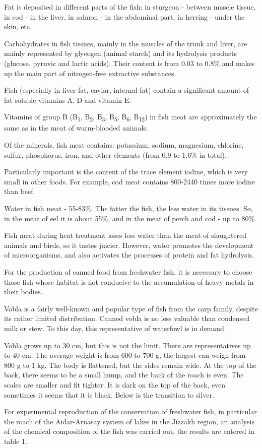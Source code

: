 \begin{multicols}{2}
Fat is deposited in different parts of the fish: in sturgeon - between
muscle tissue, in cod - in the liver, in salmon - in the abdominal part,
in herring - under the skin, etc.

Carbohydrates in fish tissues, mainly in the muscles of the trunk and
liver, are mainly represented by glycogen (animal starch) and its
hydrolysis products (glucose, pyruvic and lactic acids). Their content
is from 0.03 to 0.8\% and makes up the main part of nitrogen-free
extractive substances.

Fish (especially in liver fat, caviar, internal fat) contain a
significant amount of fat-soluble vitamins A, D and vitamin E.

Vitamins of group B (B\textsubscript{1}, B\textsubscript{2},
B\textsubscript{3}, B\textsubscript{5}, B\textsubscript{6},
B\textsubscript{12}) in fish meat are approximately the same as in the
meat of warm-blooded animals.

Of the minerals, fish meat contains: potassium, sodium, magnesium,
chlorine, sulfur, phosphorus, iron, and other elements (from 0.9 to
1.6\% in total).

Particularly important is the content of the trace element iodine, which
is very small in other foods. For example, cod meat contains 800-2440
times more iodine than beef.

Water in fish meat - 55-83\%. The fatter the fish, the less water in its
tissues. So, in the meat of eel it is about 55\%, and in the meat of
perch and cod - up to 80\%.

Fish meat during heat treatment loses less water than the meat of
slaughtered animals and birds, so it tastes juicier. However, water
promotes the development of microorganisms, and also activates the
processes of protein and fat hydrolysis.

For the production of canned food from freshwater fish, it is necessary
to choose those fish whose habitat is not conducive to the accumulation
of heavy metals in their bodies.

Vobla is a fairly well-known and popular type of fish from the carp
family, despite its rather limited distribution. Canned vobla is no less
valuable than condensed milk or stew. To this day, this representative
of waterfowl is in demand.

Vobla grows up to 30 cm, but this is not the limit. There are
representatives up to 40 cm. The average weight is from 600 to 700 g,
the largest can weigh from 800 g to 1 kg. The body is flattened, but the
sides remain wide. At the top of the back, there seems to be a small
hump, and the back of the roach is even. The scales are smaller and fit
tighter. It is dark on the top of the back, even sometimes it seems that
it is black. Below is the transition to silver.

For experimental reproduction of the conservation of freshwater fish, in
particular the roach of the Aidar-Arnasay system of lakes in the Jizzakh
region, an analysis of the chemical composition of the fish was carried
out, the results are entered in table 1.
\end{multicols}

